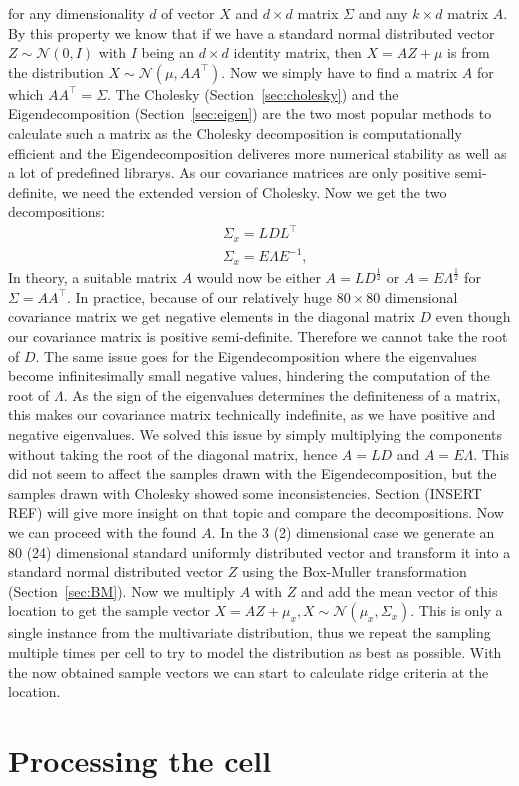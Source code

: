 \noindent for any dimensionality $d$ of vector $X$ and $d \times d$
matrix $\Sigma$ and any $k \times d$ matrix $A$. By this property we
know that if we have a standard normal distributed vector $Z \sim
\mathcal{N}(0,I)$ with $I$ being an $d \times d$ identity matrix, then
$X = AZ + \mu$ is from the distribution $X \sim \mathcal{N}(\mu, A
A^\top)$. Now we simply have to find a matrix $A$ for which $AA^\top =
\Sigma$. The Cholesky (Section~\ref{sec:cholesky}) and the
Eigendecomposition (Section~\ref{sec:eigen}) are the two most popular
methods to calculate such a matrix as the Cholesky decomposition is
computationally efficient and the Eigendecomposition deliveres more
numerical stability as well as a lot of predefined librarys. As our
covariance matrices are only positive semi-definite, we need the
extended version of Cholesky. Now we get the two decompositions:
\begin{align}
    &\Sigma_x = L D L^\top \\
    &\Sigma_x = E \Lambda E^{-1},
\end{align}
In theory, a suitable matrix $A$ would now be either $A=L
D^{\frac{1}{2}}$ or $A=E\Lambda^{\frac{1}{2}}$ for $\Sigma = AA^\top$.
In practice, because of our relatively huge $80 \times 80$ dimensional
covariance matrix we get negative elements in the diagonal matrix $D$
even though our covariance matrix is positive semi-definite. Therefore
we cannot take the root of $D$. The same issue goes for the
Eigendecomposition where the eigenvalues become infinitesimally small
negative values, hindering the computation of the root of $\Lambda$. As
the sign of the eigenvalues determines the definiteness of a matrix,
this makes our covariance matrix technically indefinite, as we have
positive and negative eigenvalues. We solved this issue by simply
multiplying the components without taking the root of the diagonal
matrix, hence $A = LD$ and $A = E \Lambda$. This did not seem to affect
the samples drawn with the Eigendecomposition, but the samples drawn
with Cholesky showed some inconsistencies. Section (INSERT REF) will
give more insight on that topic and compare the decompositions. Now we
can proceed with the found $A$. In the 3 (2) dimensional  case we
generate an 80 (24) dimensional standard uniformly distributed vector
and transform it into a standard normal distributed vector $Z$ using
the Box-Muller transformation (Section~\ref{sec:BM}). Now we multiply
$A$ with $Z$ and add the mean vector of this location to get the sample
vector $X = AZ + \mu_x, X \sim \mathcal{N}(\mu_x, \Sigma_x)$. This is
only a single instance from the multivariate distribution, thus we
repeat the sampling multiple times per cell to try to model the
distribution as best as possible. With the now obtained sample vectors
we can start to calculate ridge criteria at the location.

\section{Processing the cell}\label{sec:proc}
